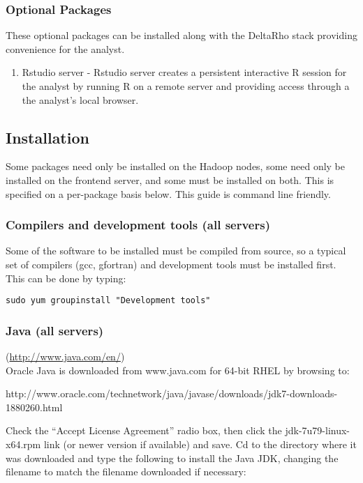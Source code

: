\subsubsection{Optional Packages}
These optional packages can be installed along with the DeltaRho stack providing convenience for the analyst.
\begin{enumerate}
\item Rstudio server - Rstudio server creates a persistent interactive R session for the analyst by running R on a remote server and providing access through a the analyst's local browser.
\end{enumerate}

\newpage

\subsection{Installation}
Some packages need only be installed on the Hadoop nodes, some need only
be installed on the frontend server, and some must be installed on both.
This is specified on a per-package basis below. This guide is command
line friendly.

\subsubsection{Compilers and development tools (all servers)}
Some of the software to be installed must be compiled from source, so a
typical set of compilers (gcc, gfortran) and development tools must
be installed first.  This can be done by typing:

\begin{verbatim}
sudo yum groupinstall "Development tools"
\end{verbatim}

\subsubsection{Java (all servers)} (\url{http://www.java.com/en/})\\
Oracle Java is downloaded from www.java.com for 64-bit RHEL by browsing to:

http://www.oracle.com/technetwork/java/javase/downloads/jdk7-downloads-1880260.html

Check the ``Accept License Agreement'' radio box, then click the
jdk-7u79-linux-x64.rpm link (or newer version if available) and save.
Cd to the directory where it was downloaded and type the following to install
the Java JDK, changing the filename to match the filename downloaded
if necessary:

